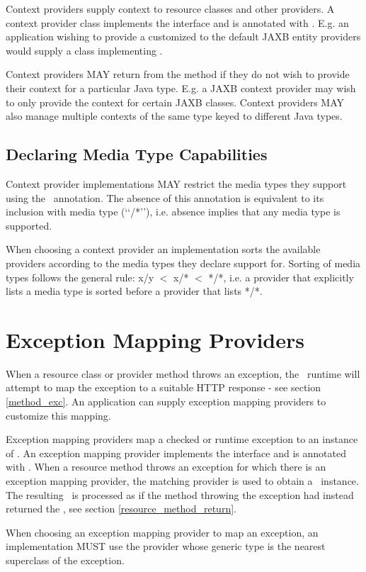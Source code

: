 Context providers supply context to resource classes and other providers. A context provider class implements the  interface and is annotated with \Provider. E.g. an application wishing to provide a customized  to the default JAXB entity providers would supply a class implementing .

Context providers MAY return  from the  method if they do not wish to provide their context for a particular Java type. E.g. a JAXB context provider may wish to only provide the context for certain JAXB classes. Context providers MAY also manage multiple contexts of the same type keyed to different Java types.

\subsection{Declaring Media Type Capabilities}
\label{context_media_type}

Context provider implementations MAY restrict the media types they support using the \Produces\ annotation. The absence of this annotation is equivalent to its inclusion with media type (\lq\lq*/*\rq\rq), i.e. absence implies that any media type is supported.

When choosing a context provider an implementation sorts the available providers according to the media types they declare support for. Sorting of media types follows the general rule: x/y $<$ x/* $<$ */*, i.e. a provider that explicitly lists a media type is sorted before a provider that lists */*.

\section{Exception Mapping Providers}
\label{exceptionmapper}

When a resource class or provider method throws an exception, the \jaxrs\ runtime will attempt to map the exception to a suitable HTTP response - see section \ref{method_exc}. An application can supply exception mapping providers to customize this mapping.

Exception mapping providers map a checked or runtime exception to an instance of \Response. An exception mapping provider implements the  interface and is annotated with \Provider. When a resource method throws an exception for which there is an exception mapping provider, the matching provider is used to obtain a \Response\ instance. The resulting \Response\ is processed as if the method throwing the exception had instead returned the \Response, see section \ref{resource_method_return}.

When choosing an exception mapping provider to map an exception, an implementation MUST use the provider whose generic type is the nearest superclass of the exception.
